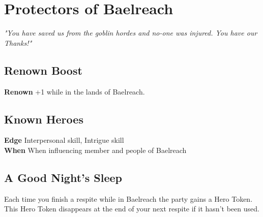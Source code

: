 \documentclass[letterpaper,openany,twoside,twocolumn]{book}
\begin{document}
	
	\rendercharactersheet
	\renderbackgroundsheet
	\renderactionpanelsheet
	\rendertreasuressheet	
	
	
	\section*{Protectors of Baelreach}
	\textit{"You have saved us from the goblin hordes and no-one was injured. You have our Thanks!"}
	\subsection*{Renown Boost}
	\textbf{Renown} +1 while in the lands of Baelreach.
	\subsection*{Known Heroes}
	\textbf{Edge} Interpersonal skill, Intrigue skill\\
	\textbf{When} When influencing member and people of Baelreach
	\subsection*{A Good Night's Sleep}
	Each time you finish a respite while in Baelreach the party gains a Hero Token. This Hero Token disappears at the end of your next respite if it hasn't been used.
	
\end{document}
